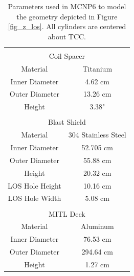 \begin{table}[!h]
	\caption{Parameters used in MCNP6 to model the geometry depicted in Figure \ref{fig_z_los}. All cylinders are centered about TCC.  }
	\label{tab_externalParameters}
	\renewcommand{\arraystretch}{1.2} 
	\centering
	\begin{tabular}{  c c  }
		&\\
		\multicolumn{2}{c}{Coil Spacer} \\\hline
		Material & Titanium \\
		Inner Diameter & 4.62 cm \\		%
		Outer Diameter	& 13.26 cm \\	%
		Height	& 3.38" \\				%
		&\\
		\multicolumn{2}{c}{Blast Shield} \\\hline
		Material & 304 Stainless Steel \\
		Inner Diameter & 52.705 cm \\
		Outer Diameter	& 55.88 cm \\
		Height	& 20.32 cm \\
		LOS Hole Height & 10.16 cm \\
		LOS Hole Width & 5.08 cm \\
		&\\
		\multicolumn{2}{c}{MITL Deck} \\\hline
		Material & Aluminum \\
		Inner Diameter & 76.53 cm \\
		Outer Diameter	& 294.64 cm \\
		Height	& 1.27 cm \\
	\end{tabular}		
\end{table}

